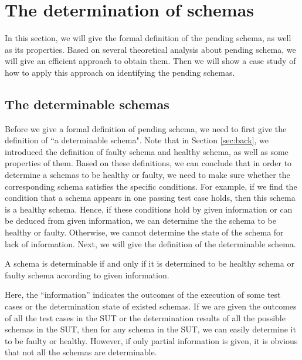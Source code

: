 \section{The determination of schemas}\label{sec:pending}
In this section, we will give the formal definition of the pending schema, as well as its properties. Based on several theoretical analysis about pending schema, we will give an efficient approach to obtain them. Then we will show a case study of  how to apply this approach on identifying the pending schemas.

\subsection{The determinable schemas}\label{sec:pending:determinable}
Before we give a formal definition of pending schema, we need to first give the definition of ``a determinable schema". Note that in Section \ref{sec:back}, we introduced the definition of faulty schema and healthy schema, as well as some properties of them. Based on these definitions, we can conclude that in order to determine a schemas to be healthy or faulty, we need to make sure whether the corresponding schema satisfies the specific conditions. For example, if we find the condition that a schema appears in one passing test case holds, then this schema is a healthy schema. Hence, if these conditions hold by given information or can be deduced from given information, we can determine the the schema to be healthy or faulty. Otherwise, we cannot determine the state of the schema for lack of information. Next, we will give the definition of the determinable schema.


\begin{definition}\label{de:deteminable}
A schema is determinable if and only if it is determined to be healthy schema or faulty schema according to given information.
\end{definition}

Here, the ``information'' indicates the outcomes of the execution of some test cases or the determination state of existed schemas. If we are given the outcomes of all the test cases in the SUT or the determination results of all the possible schemas in the SUT, then for any schema in the SUT, we can easily determine it to be faulty or healthy. However, if only partial information is given, it is obvious that not all the schemas are determinable.

